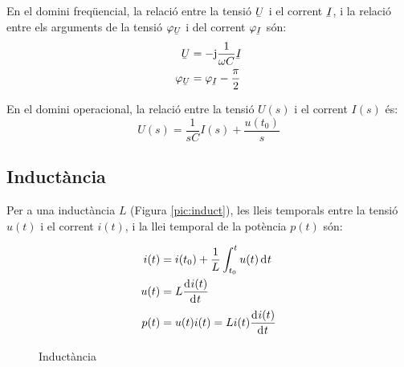 En el domini freq\"{u}encial, la relaci\'{o} entre la tensi\'{o} $\cmplx{U}$ i el corrent $\cmplx{I}$, i la relaci\'{o} entre els arguments de la tensi\'{o} $\varphi_{\cmplx{U}}$ i del corrent $\varphi_{\cmplx{I}}$ s\'{o}n:
\begin{align}
   \cmplx{U} &= -\ju \frac{1}{\omega C} \cmplx{I} \\
   \varphi_{\cmplx{U}} &= \varphi_{\cmplx{I}} - \frac{\pi}{2}
\end{align}

En el domini operacional, la relaci\'{o} entre la tensi\'{o} $U(s)$ i el corrent $I(s)$ \'{e}s:
\begin{equation}
   U(s) = \frac{1}{s C} I(s) + \frac{u(t_0)}{s}
\end{equation}


\subsection{Induct\`{a}ncia} 

Per a una induct\`{a}ncia $L$ (Figura \vref{pic:induct}),
les lleis temporals entre la tensi\'{o} $u(t)$ i el corrent $i(t)$, i la llei temporal
de la pot\`{e}ncia $p(t)$ s\'{o}n:
\begin{figure}[htb]
\hfill
\begin{minipage}[b]{5cm}
\caption{Induct\`{a}ncia} \label{pic:induct}
\end{minipage}
\hfill
\begin{minipage}[b][3.8cm][t]{8cm}
   \begin{align}
      i(t) &= i(t_0) + \frac{1}{L} \int_{t_0}^t u(t) \diff t \\
      u(t) &= L \deriv{i(t)}{t} \\
      p(t) &= u(t) i(t) = L i(t) \deriv{i(t)}{t}
   \end{align}
\end{minipage}
\end{figure}

